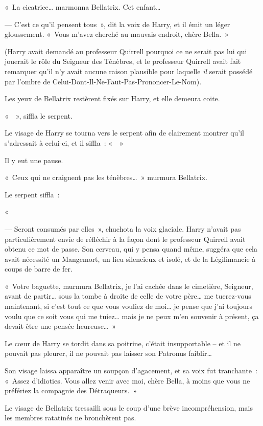 «~La cicatrice… marmonna Bellatrix. Cet enfant…

--- C'est ce qu'il pensent tous~», dit la voix de Harry, et il émit un léger gloussement. «~Vous m'avez cherché au mauvais endroit, chère Bella.~»

(Harry avait demandé au professeur Quirrell pourquoi ce ne serait pas lui qui jouerait le rôle du Seigneur des Ténèbres, et le professeur Quirrell avait fait remarquer qu'il n'y avait aucune raison plausible pour laquelle \emph{il} serait possédé par l'ombre de Celui-Dont-Il-Ne-Faut-Pas-Prononcer-Le-Nom).

Les yeux de Bellatrix restèrent fixés sur Harry, et elle demeura coite.

«~~», siffla le serpent.

Le visage de Harry se tourna vers le serpent afin de clairement montrer qu'il s'adressait à celui-ci, et il siffla~: «~~»

Il y eut une pause.

«~Ceux qui ne craignent pas les ténèbres…~» murmura Bellatrix.

Le serpent siffla~:

«~

--- Seront consumés par elles~», chuchota la voix glaciale. Harry n'avait pas particulièrement envie de réfléchir à la façon dont le professeur Quirrell avait obtenu ce mot de passe. Son cerveau, qui y pensa quand même, suggéra que cela avait nécessité un Mangemort, un lieu silencieux et isolé, et de la Légilimancie à coups de barre de fer.

«~Votre baguette, murmura Bellatrix, je l'ai cachée dans le cimetière, Seigneur, avant de partir… sous la tombe à droite de celle de votre père… me tuerez-vous maintenant, si c'est tout ce que vous vouliez de moi… je pense que j'ai toujours voulu que ce soit vous qui me tuiez… mais je ne peux m'en souvenir à présent, ça devait être une pensée heureuse…~»

Le cœur de Harry se tordit dans sa poitrine, c'était insupportable -- et il ne pouvait pas pleurer, il ne pouvait pas laisser son Patronus faiblir…

Son visage laissa apparaître un soupçon d'agacement, et sa voix fut tranchante~: «~Assez d'idioties. Vous allez venir avec moi, chère Bella, à moins que vous ne préfériez la compagnie des Détraqueurs.~»

Le visage de Bellatrix tressailli sous le coup d'une brève incompréhension, mais les membres ratatinés ne bronchèrent pas.

